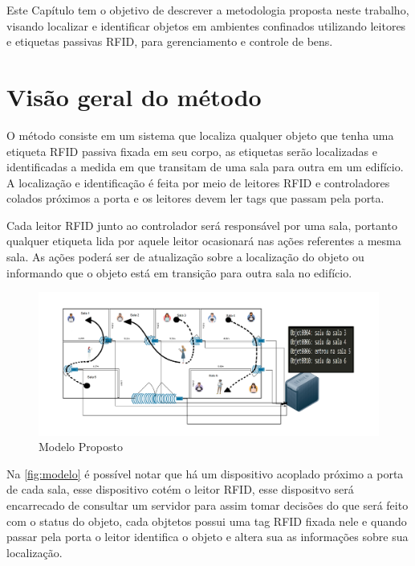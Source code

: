 
\label{chapter:metodo}
Este Capítulo tem o objetivo de descrever a metodologia proposta neste trabalho, visando localizar e identificar objetos em ambientes confinados utilizando leitores e etiquetas passivas RFID, para gerenciamento e controle de bens.

\section{Visão geral do método}
O método consiste em um sistema que localiza qualquer objeto que tenha uma etiqueta RFID passiva fixada em seu corpo, as etiquetas serão localizadas e identificadas a medida em que transitam de uma sala para outra em um edifício. A localização e identificação é feita por meio de leitores RFID e controladores colados próximos a porta e os leitores devem ler tags que passam pela porta.
\par
Cada leitor RFID junto ao controlador será responsável por uma sala, portanto qualquer etiqueta lida por aquele leitor ocasionará nas ações referentes a mesma sala. As ações poderá ser de atualização sobre a localização do objeto ou informando que o objeto está em transição para outra sala no edifício.
\begin{figure}[H]
              \caption{\label{fig:modelo}{Modelo Proposto}}
              \centering
              \includegraphics[width=1.1\textwidth]{Figuras/bigpicture.png}
        \end{figure}
\par
Na \autoref{fig:modelo} é possível notar que há um dispositivo acoplado próximo a porta de cada sala, esse dispositivo cotém o leitor RFID, esse dispositvo será encarrecado de consultar um servidor para assim tomar decisões do que será feito com o status do objeto, cada objtetos possui uma tag RFID fixada nele e quando passar pela porta o leitor identifica o objeto e altera sua as informações sobre sua localização.

